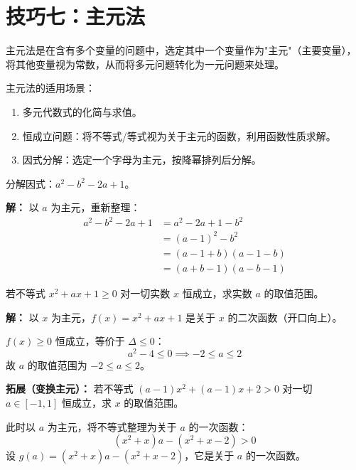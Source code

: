 \documentclass[12pt, a4paper]{ctexart}
\begin{document}
\section*{\textcolor{mainblue}{技巧七：主元法}}

\begin{knowledgebox}[主元法的核心思想]
主元法是在含有多个变量的问题中，选定其中一个变量作为"主元"（主要变量），将其他变量视为常数，从而将多元问题转化为一元问题来处理。

主元法的适用场景：
\begin{enumerate}[leftmargin=2em]
  \item 多元代数式的化简与求值。
  \item 恒成立问题：将不等式/等式视为关于主元的函数，利用函数性质求解。
  \item 因式分解：选定一个字母为主元，按降幂排列后分解。
\end{enumerate}
\end{knowledgebox}

\begin{examplebox}[【例14】主元法因式分解]
分解因式：$a^2 - b^2 - 2a + 1$。
\end{examplebox}

\textbf{解：} 以 $a$ 为主元，重新整理：
\begin{align*}
a^2 - b^2 - 2a + 1 &= a^2 - 2a + 1 - b^2 \\
&= (a-1)^2 - b^2 \\
&= (a-1+b)(a-1-b) \\
&= \boxed{(a+b-1)(a-b-1)}
\end{align*}

\begin{examplebox}[【例15】主元法求恒成立条件]
若不等式 $x^2 + ax + 1 \geqslant 0$ 对一切实数 $x$ 恒成立，求实数 $a$ 的取值范围。
\end{examplebox}

\textbf{解：} 以 $x$ 为主元，$f(x) = x^2 + ax + 1$ 是关于 $x$ 的二次函数（开口向上）。

$f(x) \geqslant 0$ 恒成立，等价于 $\Delta \leqslant 0$：
\[
a^2 - 4 \leqslant 0 \implies -2 \leqslant a \leqslant 2
\]
故 $a$ 的取值范围为 $\boxed{-2 \leqslant a \leqslant 2}$。

\textbf{拓展（变换主元）：} 若不等式 $(a-1)x^2 + (a-1)x + 2 > 0$ 对一切 $a \in [-1, 1]$ 恒成立，求 $x$ 的取值范围。

此时以 $a$ 为主元，将不等式整理为关于 $a$ 的一次函数：
\[
(x^2+x)a - (x^2+x-2) > 0
\]
设 $g(a) = (x^2+x)a - (x^2+x-2)$，它是关于 $a$ 的一次函数。
\end{document}
